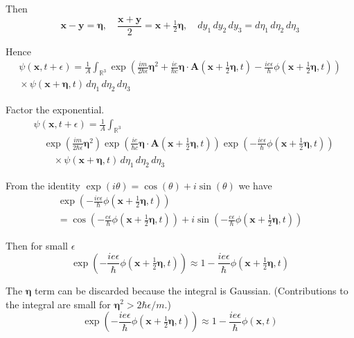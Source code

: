 \documentclass[12pt]{article}
\newcommand\INT{\int_{\mathbb R^3}}
\begin{document}
Then
\begin{equation*}
\mathbf x-\mathbf y=\boldsymbol\eta,\quad
\frac{\mathbf x+\mathbf y}{2}=\mathbf{x}+\tfrac{1}{2}\boldsymbol\eta,\quad
dy_1\,dy_2\,dy_3=d\eta_1\,d\eta_2\,d\eta_3
\end{equation*}

Hence
\begin{multline*}
\psi(\mathbf x,t+\epsilon)=
\frac{1}{A}\INT\exp
\left(
\frac{im}{2\hbar\epsilon}\boldsymbol\eta^2
+\frac{ie}{\hbar c}\boldsymbol\eta\cdot\mathbf A\left(\mathbf x+\tfrac{1}{2}\boldsymbol\eta,t\right)
-\frac{ie\epsilon}{\hbar}\phi\left(\mathbf x+\tfrac{1}{2}\boldsymbol\eta,t\right)
\right)
\\
{}\times\psi(\mathbf x+\boldsymbol\eta,t)
\,d\eta_1\,d\eta_2\,d\eta_3
\end{multline*}

Factor the exponential.
\begin{align*}
&\psi(\mathbf x,t+\epsilon)=
\frac{1}{A}\INT
\\
&\quad{}\exp\left(\frac{im}{2\hbar\epsilon}\boldsymbol\eta^2\right)
\exp\left(\frac{ie}{\hbar c}\boldsymbol\eta\cdot\mathbf A\left(\mathbf x+\tfrac{1}{2}\boldsymbol\eta,t\right)\right)
\exp\left(-\frac{ie\epsilon}{\hbar}\phi\left(\mathbf x+\tfrac{1}{2}\boldsymbol\eta,t\right)\right)
\\
&\quad\quad{}\times\psi(\mathbf x+\boldsymbol\eta,t)
\,d\eta_1\,d\eta_2\,d\eta_3
\tag{2}
\end{align*}

From the identity $\exp(i\theta)=\cos(\theta)+i\sin(\theta)$ we have
\begin{multline*}
\exp\left(-\frac{ie\epsilon}{\hbar}\phi\left(\mathbf x+\tfrac{1}{2}\boldsymbol\eta,t\right)\right)
\\
=\cos\left(-\frac{e\epsilon}{\hbar}\phi\left(\mathbf x+\tfrac{1}{2}\boldsymbol\eta,t\right)\right)
+i\sin\left(-\frac{e\epsilon}{\hbar}\phi\left(\mathbf x+\tfrac{1}{2}\boldsymbol\eta,t\right)\right)
\end{multline*}

Then for small $\epsilon$
\begin{equation*}
\exp\left(-\frac{ie\epsilon}{\hbar}\phi\left(\mathbf x+\tfrac{1}{2}\boldsymbol\eta,t\right)\right)
\approx
1-\frac{ie\epsilon}{\hbar}\phi\left(\mathbf x+\tfrac{1}{2}\boldsymbol\eta,t\right)
\end{equation*}

The $\boldsymbol\eta$ term can be discarded because the integral is Gaussian.
(Contributions to the integral are small for $\boldsymbol\eta^2>2\hbar\epsilon/m$.)
\begin{equation*}
\exp\left(-\frac{ie\epsilon}{\hbar}\phi\left(\mathbf x+\tfrac{1}{2}\boldsymbol\eta,t\right)\right)\approx
1-\frac{ie\epsilon}{\hbar}\phi(\mathbf x,t)
\tag{3}
\end{equation*}
\end{document}
